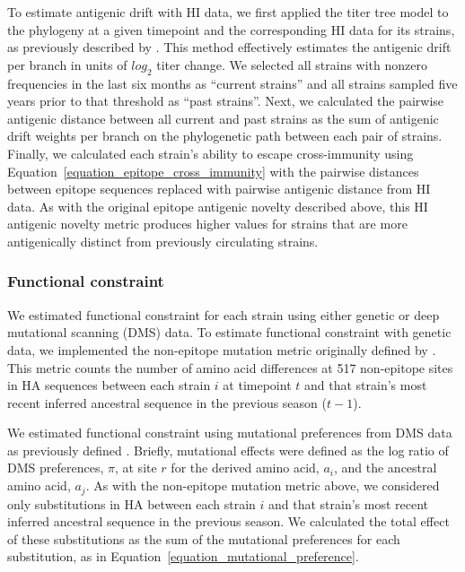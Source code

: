 To estimate antigenic drift with HI data, we first applied the titer tree model to the phylogeny at a given timepoint and the corresponding HI data for its strains, as previously described by \cite{Neher:2016hy}.
This method effectively estimates the antigenic drift per branch in units of $log_{2}$ titer change.
We selected all strains with nonzero frequencies in the last six months as ``current strains'' and all strains sampled five years prior to that threshold as ``past strains''.
Next, we calculated the pairwise antigenic distance between all current and past strains as the sum of antigenic drift weights per branch on the phylogenetic path between each pair of strains.
Finally, we calculated each strain's ability to escape cross-immunity using Equation~\ref{equation_epitope_cross_immunity} with the pairwise distances between epitope sequences replaced with pairwise antigenic distance from HI data.
As with the original epitope antigenic novelty described above, this HI antigenic novelty metric produces higher values for strains that are more antigenically distinct from previously circulating strains.

\subsubsection{Functional constraint}

We estimated functional constraint for each strain using either genetic or deep mutational scanning (DMS) data.
To estimate functional constraint with genetic data, we implemented the non-epitope mutation metric originally defined by \cite{Luksza:2014hj}.
This metric counts the number of amino acid differences at 517 non-epitope sites in HA sequences between each strain $i$ at timepoint $t$ and that strain's most recent inferred ancestral sequence in the previous season ($t - 1$).

We estimated functional constraint using mutational preferences from DMS data as previously defined \citep{Lee2018}.
Briefly, mutational effects were defined as the log ratio of DMS preferences, $\pi$, at site $r$ for the derived amino acid, $a_{i}$, and the ancestral amino acid, $a_{j}$.
As with the non-epitope mutation metric above, we considered only substitutions in HA between each strain $i$ and that strain's most recent inferred ancestral sequence in the previous season.
We calculated the total effect of these substitutions as the sum of the mutational preferences for each substitution, as in Equation~\ref{equation_mutational_preference}.

